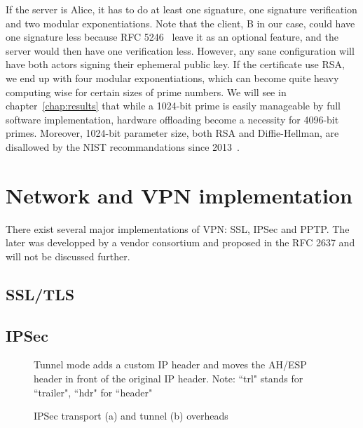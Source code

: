 If the server is Alice, it has to do at least one signature, one signature verification and two modular exponentiations.
Note that the client, B in our case, could have one signature less because RFC 5246~\cite{rfc5246} leave it as an optional feature, and the server would then have one verification less.
However, any sane configuration will have both actors signing their ephemeral public key.
If the certificate use RSA, we end up with four modular exponentiations, which can become quite heavy computing wise for certain sizes of prime numbers.
We will see in chapter~\ref{chap:results} that while a 1024-bit prime is easily manageable by full software implementation, hardware offloading become a necessity for 4096-bit primes.
Moreover, 1024-bit parameter size, both RSA and Diffie-Hellman, are disallowed by the NIST recommandations since 2013~\cite{nist-sp800-131A}.

\section{Network and VPN implementation}



There exist several major implementations of VPN: SSL, IPSec and PPTP.
The later was developped by a vendor consortium and proposed in the RFC 2637 and will not be discussed further.

\subsection{SSL/TLS}

\subsection{IPSec}

\begin{figure}[ht]
\center
{}
\caption{IPSec transport (a) and tunnel (b) overheads}{Tunnel mode adds a custom IP header and moves the AH/ESP header in front of the original IP header. Note: ``trl" stands for ``trailer", ``hdr" for ``header"}
\label{fig:ipsec-transport-tunnel}
\end{figure}